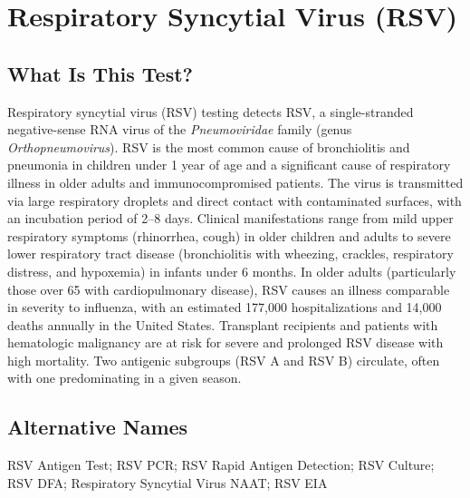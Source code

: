 \chapter{Respiratory Syncytial Virus (RSV)}

\section*{What Is This Test?}
Respiratory syncytial virus (RSV) testing detects RSV, a single-stranded negative-sense RNA virus of the \textit{Pneumoviridae} family (genus \textit{Orthopneumovirus}). RSV is the most common cause of bronchiolitis and pneumonia in children under 1 year of age and a significant cause of respiratory illness in older adults and immunocompromised patients. The virus is transmitted via large respiratory droplets and direct contact with contaminated surfaces, with an incubation period of 2--8 days. Clinical manifestations range from mild upper respiratory symptoms (rhinorrhea, cough) in older children and adults to severe lower respiratory tract disease (bronchiolitis with wheezing, crackles, respiratory distress, and hypoxemia) in infants under 6 months. In older adults (particularly those over 65 with cardiopulmonary disease), RSV causes an illness comparable in severity to influenza, with an estimated 177,000 hospitalizations and 14,000 deaths annually in the United States. Transplant recipients and patients with hematologic malignancy are at risk for severe and prolonged RSV disease with high mortality. Two antigenic subgroups (RSV A and RSV B) circulate, often with one predominating in a given season.

\section*{Alternative Names}
RSV Antigen Test; RSV PCR; RSV Rapid Antigen Detection; RSV Culture; RSV DFA; Respiratory Syncytial Virus NAAT; RSV EIA


